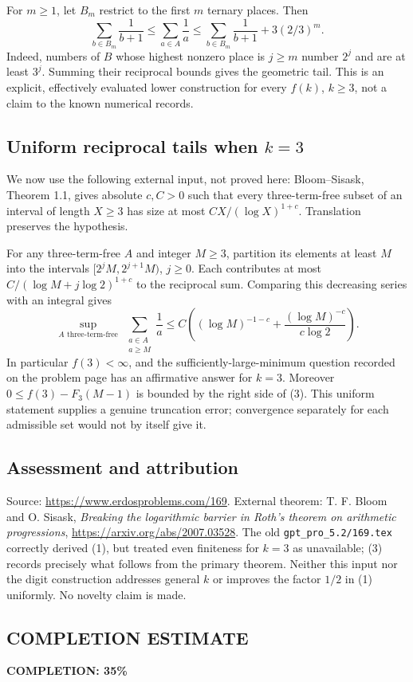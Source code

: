 For $m\ge1$, let $B_m$ restrict to the first $m$ ternary places. Then
\[
 \sum_{b\in B_m}\frac1{b+1}
 \le \sum_{a\in A}\frac1a
 \le \sum_{b\in B_m}\frac1{b+1}
       +3(2/3)^m.
 \tag{2}
\]
Indeed, numbers of $B$ whose highest nonzero place is $j\ge m$ number $2^j$ and are at least $3^j$. Summing their reciprocal bounds gives the geometric tail. This is an explicit, effectively evaluated lower construction for every $f(k)$, $k\ge3$, not a claim to the known numerical records.

\subsection*{Uniform reciprocal tails when $k=3$}
We now use the following external input, not proved here: Bloom--Sisask, Theorem 1.1, gives absolute $c,C>0$ such that every three-term-free subset of an interval of length $X\ge3$ has size at most
$CX/(\log X)^{1+c}$. Translation preserves the hypothesis.

For any three-term-free $A$ and integer $M\ge3$, partition its elements at least $M$ into the intervals
$[2^jM,2^{j+1}M)$, $j\ge0$. Each contributes at most
$C/(\log M+j\log2)^{1+c}$ to the reciprocal sum. Comparing this decreasing series with an integral gives
\[
 \sup_{A\text{ three-term-free}}\ 
 \sum_{\substack{a\in A\\a\ge M}}\frac1a
 \le C\left((\log M)^{-1-c}
       +\frac{(\log M)^{-c}}{c\log2}\right).
 \tag{3}
\]
In particular $f(3)<\infty$, and the sufficiently-large-minimum question recorded on the problem page has an affirmative answer for $k=3$. Moreover
$0\le f(3)-F_3(M-1)$ is bounded by the right side of (3). This uniform statement supplies a genuine truncation error; convergence separately for each admissible set would not by itself give it.

\subsection*{Assessment and attribution}
Source: \url{https://www.erdosproblems.com/169}. External theorem: T. F. Bloom and O. Sisask, \emph{Breaking the logarithmic barrier in Roth's theorem on arithmetic progressions}, \url{https://arxiv.org/abs/2007.03528}. The old \texttt{gpt\_pro\_5.2/169.tex} correctly derived (1), but treated even finiteness for $k=3$ as unavailable; (3) records precisely what follows from the primary theorem. Neither this input nor the digit construction addresses general $k$ or improves the factor $1/2$ in (1) uniformly. No novelty claim is made.
\subsection*{COMPLETION ESTIMATE}
\textbf{COMPLETION: 35\%}
